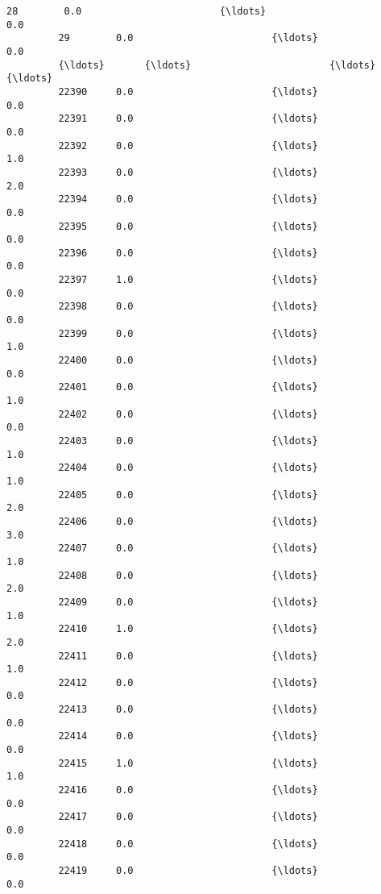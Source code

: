\documentclass[11pt]{article}
\begin{document}
\begin{Verbatim}[commandchars=\\\{\}]
         28        0.0                        {\ldots}                             0.0   
         29        0.0                        {\ldots}                             0.0   
         {\ldots}       {\ldots}                        {\ldots}                             {\ldots}   
         22390     0.0                        {\ldots}                             0.0   
         22391     0.0                        {\ldots}                             0.0   
         22392     0.0                        {\ldots}                             1.0   
         22393     0.0                        {\ldots}                             2.0   
         22394     0.0                        {\ldots}                             0.0   
         22395     0.0                        {\ldots}                             0.0   
         22396     0.0                        {\ldots}                             0.0   
         22397     1.0                        {\ldots}                             0.0   
         22398     0.0                        {\ldots}                             0.0   
         22399     0.0                        {\ldots}                             1.0   
         22400     0.0                        {\ldots}                             0.0   
         22401     0.0                        {\ldots}                             1.0   
         22402     0.0                        {\ldots}                             0.0   
         22403     0.0                        {\ldots}                             1.0   
         22404     0.0                        {\ldots}                             1.0   
         22405     0.0                        {\ldots}                             2.0   
         22406     0.0                        {\ldots}                             3.0   
         22407     0.0                        {\ldots}                             1.0   
         22408     0.0                        {\ldots}                             2.0   
         22409     0.0                        {\ldots}                             1.0   
         22410     1.0                        {\ldots}                             2.0   
         22411     0.0                        {\ldots}                             1.0   
         22412     0.0                        {\ldots}                             0.0   
         22413     0.0                        {\ldots}                             0.0   
         22414     0.0                        {\ldots}                             0.0   
         22415     1.0                        {\ldots}                             1.0   
         22416     0.0                        {\ldots}                             0.0   
         22417     0.0                        {\ldots}                             0.0   
         22418     0.0                        {\ldots}                             0.0   
         22419     0.0                        {\ldots}                             0.0   
         

\end{Verbatim}
\end{document}
